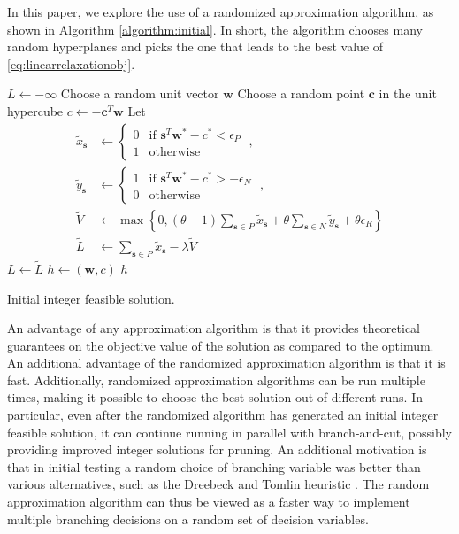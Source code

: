 \documentclass[11pt]{article}
\theoremstyle{definition}
\newcommand{\vect}[1]{\mathbf{#1}}
\newcommand{\sv}[1]{_{\vect{#1}}}
\begin{document}
In this paper, we explore the use of a randomized approximation algorithm,
as shown in Algorithm \ref{algorithm:initial}. 
In short, the algorithm chooses many random hyperplanes and picks 
the one that leads to the best value of \eqref{eq:linearrelaxationobj}.
\begin{algorithm}
\begin{algorithmic}
\STATE $L \leftarrow - \infty$
\STATE Choose a random unit vector $\vect{w}$
\STATE Choose a random point $\vect{c}$ in the unit hypercube
\STATE $c \leftarrow - \vect{c}^T \vect{w}$
\STATE Let 
\begin{align*}
\tilde{x}\sv{s} & \leftarrow \begin{cases}
0 & \text{if } \vect{s}^T \vect{w}^* - c^* < \epsilon_P \\
1 & \text{otherwise}
\end{cases}\;,\\
\tilde{y}\sv{s} & \leftarrow \begin{cases}
1 & \text{if } \vect{s}^T \vect{w}^* - c^* > - \epsilon_N \\
0 & \text{otherwise}
\end{cases}\;,\\
\tilde{V} & \leftarrow \max \left\{ 0,
(\theta  - 1) \sum_{\vect{s} \in P} \tilde{x}\sv{s} + 
\theta \sum_{\vect{s} \in N} \tilde{y}\sv{s} + 
\theta \epsilon_R \right\}\\
\tilde{L} & \leftarrow 
\sum_{\vect{s} \in P} \tilde{x}\sv{s} - \lambda \tilde{V}
\end{align*}
\STATE $L \leftarrow \tilde{L}$
\STATE $h \leftarrow (\vect{w}, c)$
\ENDIF
\ENDFOR
\RETURN $h$
\end{algorithmic}
\caption{Initial integer feasible solution.}
\label{algorithm:initial}
\end{algorithm}
An advantage of any approximation algorithm is that
it provides theoretical guarantees on the objective value of 
the solution as compared to the optimum.
An additional advantage of the randomized approximation algorithm is
that it is fast.
Additionally, randomized approximation algorithms can be run multiple times,
making it possible to choose the best solution out of different runs.
In particular, even after the randomized algorithm has generated an initial
integer feasible solution, it can continue running in parallel with
branch-and-cut, possibly providing improved integer solutions for pruning.  
An additional motivation is that in initial testing a random choice of branching variable was better than various alternatives, such as 
the Dreebeck and Tomlin heuristic \cite{Driebeek, Tomlin}. 
The random approximation algorithm can thus be viewed as a faster way to 
implement multiple branching decisions on a random set of decision variables.
\end{document}

